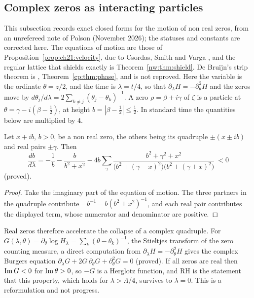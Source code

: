 \subsection{Complex zeros as interacting particles}\label{xi:sec:particles}

This subsection records exact closed forms for the motion of non real zeros, from an unrefereed note of Polson (November 2026); the statuses and constants are corrected here. The equations of motion are those of Proposition~\ref{prop:ch21:velocity}, due to Csordas, Smith and Varga \cite{CSV94}, and the regular lattice that shields exactly is Theorem~\ref{nw:thm:shield}. De Bruijn's strip theorem is \cite[Theorem 13]{deBruijn}, Theorem~\ref{cp:thm:phase}, and is not reproved. Here the variable is the ordinate $\theta=z/2$, and the time is $\lambda=t/4$, so that $\partial_\lambda H=-\partial_\theta^2H$ and the zeros move by $d\theta_j/d\lambda=2\sum_{k\ne j}(\theta_j-\theta_k)^{-1}$. A zero $\rho=\beta+i\gamma$ of $\zeta$ is a particle at $\theta=\gamma-i(\beta-\frac12)$, at height $b=|\beta-\frac12|\le\frac12$. In standard time the quantities below are multiplied by $4$.

\begin{proposition}\label{xi:prop:bdot}
Let $x+ib$, $b>0$, be a non real zero, the others being its quadruple $\pm(x\pm ib)$ and real pairs $\pm\gamma$. Then
\begin{equation}\label{xi:eq:bdot}
\frac{db}{d\lambda}=-\frac1b-\frac b{b^2+x^2}-4b\sum_\gamma\frac{b^2+\gamma^2+x^2}{\big(b^2+(\gamma-x)^2\big)\big(b^2+(\gamma+x)^2\big)}\ <0
\end{equation}
(proved).
\end{proposition}

\begin{proof}
Take the imaginary part of the equation of motion. The three partners in the quadruple contribute $-b^{-1}-b(b^2+x^2)^{-1}$, and each real pair contributes the displayed term, whose numerator and denominator are positive.
\end{proof}

Real zeros therefore accelerate the collapse of a complex quadruple. For $G(\lambda,\theta)=\partial_\theta\log H_\lambda=\sum_k(\theta-\theta_k)^{-1}$, the Stieltjes transform of the zero counting measure, a direct computation from $\partial_\lambda H=-\partial_\theta^2H$ gives the complex Burgers equation $\partial_\lambda G+2G\,\partial_\theta G+\partial_\theta^2G=0$ (proved). If all zeros are real then $\operatorname{Im} G<0$ for $\operatorname{Im}\theta>0$, so $-G$ is a Herglotz function, and RH is the statement that this property, which holds for $\lambda>\Lambda/4$, survives to $\lambda=0$. This is a reformulation and not progress.

